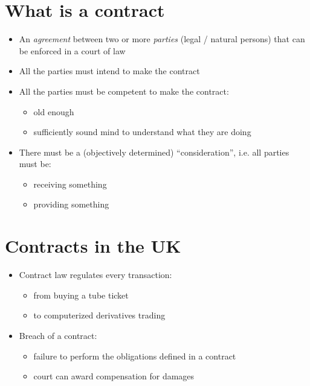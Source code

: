 \documentclass{article}
\begin{document}
\section{What is a contract}
\begin{itemize}
\item An \emph{agreement} between two or more \emph{parties} (legal / natural persons) that can be enforced in a court of law
\item All the parties must intend to make the contract
\item All the parties must be competent to make the contract:
\begin{itemize}
\item old enough
\item sufficiently sound mind to understand what they are doing
\end{itemize}
\item There must be a (objectively determined) ``consideration'', i.e. all parties must be:
\begin{itemize}
\item receiving something
\item providing something
\end{itemize}
\end{itemize}



\section{Contracts in the UK}
\begin{itemize}
\item Contract law regulates every transaction:
\begin{itemize}
\item from buying a tube ticket 
\item to computerized derivatives trading
\end{itemize}
\item Breach of a contract:
\begin{itemize}
\item failure to perform the obligations defined in a contract
\item court can award compensation for damages
\end{itemize}
\end{itemize}
\end{document}
